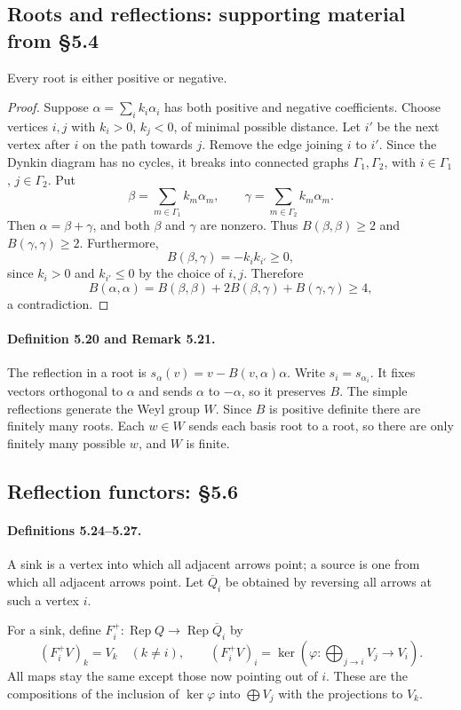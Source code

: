 \subsection*{Roots and reflections: supporting material from §5.4}
\begin{lemma}[Lemma 5.16]
Every root is either positive or negative.
\end{lemma}
\begin{proof}
Suppose $\alpha=\sum_i k_i\alpha_i$ has both positive and negative coefficients. Choose vertices $i,j$ with $k_i>0$, $k_j<0$, of minimal possible distance. Let $i'$ be the next vertex after $i$ on the path towards $j$. Remove the edge joining $i$ to $i'$. Since the Dynkin diagram has no cycles, it breaks into connected graphs $\Gamma_1,\Gamma_2$, with $i\in\Gamma_1$, $j\in\Gamma_2$. Put
\[
\beta=\sum_{m\in\Gamma_1}k_m\alpha_m,\qquad
\gamma=\sum_{m\in\Gamma_2}k_m\alpha_m.
\]
Then $\alpha=\beta+\gamma$, and both $\beta$ and $\gamma$ are nonzero. Thus $B(\beta,\beta)\ge2$ and $B(\gamma,\gamma)\ge2$. Furthermore,
\[
B(\beta,\gamma)=-k_i k_{i'}\ge0,
\]
since $k_i>0$ and $k_{i'}\le0$ by the choice of $i,j$. Therefore
\[
B(\alpha,\alpha)=B(\beta,\beta)+2B(\beta,\gamma)+B(\gamma,\gamma)\ge4,
\]
a contradiction.
\end{proof}
\paragraph{Definition 5.20 and Remark 5.21.}
The reflection in a root is $s_\alpha(v)=v-B(v,\alpha)\alpha$. Write $s_i=s_{\alpha_i}$. It fixes vectors orthogonal to $\alpha$ and sends $\alpha$ to $-\alpha$, so it preserves $B$. The simple reflections generate the Weyl group $W$. Since $B$ is positive definite there are finitely many roots. Each $w\in W$ sends each basis root to a root, so there are only finitely many possible $w$, and $W$ is finite.

\subsection*{Reflection functors: §5.6}
\paragraph{Definitions 5.24--5.27.}
A sink is a vertex into which all adjacent arrows point; a source is one from which all adjacent arrows point. Let $\overline Q_i$ be obtained by reversing all arrows at such a vertex $i$.

For a sink, define $F_i^+:\operatorname{Rep}Q\to\operatorname{Rep}\overline Q_i$ by
\[
(F_i^+V)_k=V_k\quad(k\ne i),\qquad
(F_i^+V)_i=\ker\left(\varphi:\bigoplus_{j\to i}V_j\longrightarrow V_i\right).
\]
All maps stay the same except those now pointing out of $i$. These are the compositions of the inclusion of $\ker\varphi$ into $\bigoplus V_j$ with the projections to $V_k$.

